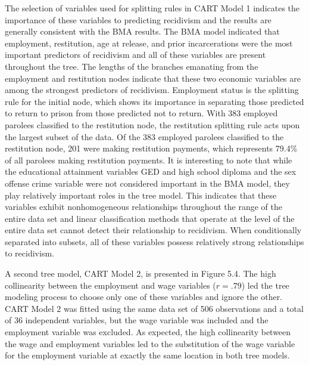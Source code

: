 The selection of variables used for splitting rules in CART Model 1 indicates the importance of these variables to predicting recidivism and the results are generally consistent with the BMA results.  The BMA model indicated that employment, restitution, age at release, and prior incarcerations were the most important predictors of recidivism and all of these variables are present throughout the tree.  The lengths of the branches emanating from the employment and restitution nodes indicate that these two economic variables are among the strongest predictors of recidivism.  Employment status is the splitting rule for the initial node, which shows its importance in separating those predicted to return to prison from those predicted not to return.  With 383 employed parolees classified to the restitution node, the restitution splitting rule acts upon the largest subset of the data.  Of the 383 employed parolees classified to the restitution node, 201 were making restitution payments, which represents 79.4\% of all parolees making restitution payments.  It is interesting to note that while the educational attainment variables GED and high school diploma and the sex offense crime variable were not considered important in the BMA model, they play relatively important roles in the tree model.  This indicates that these variables exhibit nonhomogeneous relationships throughout the range of the entire data set and linear classification methods that operate at the level of the entire data set cannot detect their relationship to recidivism.  When conditionally separated into subsets, all of these variables possess relatively strong relationships to recidivism.

A second tree model, CART Model 2, is presented in Figure 5.4.  The high collinearity between the employment and wage variables ($r=.79$) led the tree modeling process to choose only one of these variables and ignore the other.  CART Model 2 was fitted using the same data set of 506 observations and a total of 36 independent variables, but the wage variable was included and the employment variable was excluded. As expected, the high collinearity between the wage and employment variables led to the substitution of the wage variable for the employment variable at exactly the same location in both tree models.

